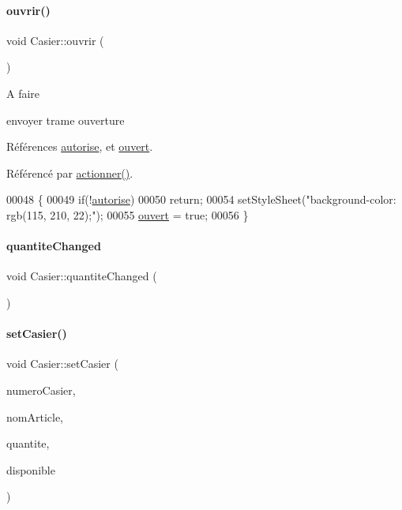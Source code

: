 \paragraph{\texorpdfstring{ouvrir()}{ouvrir()}}
{\footnotesize\ttfamily void Casier\+::ouvrir (\begin{DoxyParamCaption}{ }\end{DoxyParamCaption})}

\begin{DoxyRefDesc}{A faire}
\item[\hyperlink{todo__todo000001}{A faire}]envoyer trame ouverture \end{DoxyRefDesc}


Références \hyperlink{class_casier_a2dd9fbe4a93685080a9b5c8f69e3f29a}{autorise}, et \hyperlink{class_casier_afe544ed1a87ce714a9fbbe16126669e4}{ouvert}.



Référencé par \hyperlink{class_casier_a9182fdde9d86e8f67e4d96ca3dad5eaa}{actionner()}.


\begin{DoxyCode}
00048 \{
00049     \textcolor{keywordflow}{if}(!\hyperlink{class_casier_a2dd9fbe4a93685080a9b5c8f69e3f29a}{autorise})
00050         \textcolor{keywordflow}{return};
00054     setStyleSheet(\textcolor{stringliteral}{"background-color: rgb(115, 210, 22);"});
00055     \hyperlink{class_casier_afe544ed1a87ce714a9fbbe16126669e4}{ouvert} = \textcolor{keyword}{true};
00056 \}
\end{DoxyCode}
\mbox{\label{class_casier_af38fa35a703495e3708528f60459efa4}} 
\paragraph{\texorpdfstring{quantite\+Changed}{quantiteChanged}}
{\footnotesize\ttfamily void Casier\+::quantite\+Changed (\begin{DoxyParamCaption}{ }\end{DoxyParamCaption})\hspace{0.3cm}{\ttfamily [signal]}}

\mbox{\label{class_casier_a140dc38c9e87815b2ce7fc6dce33080b}} 
\paragraph{\texorpdfstring{set\+Casier()}{setCasier()}}
{\footnotesize\ttfamily void Casier\+::set\+Casier (\begin{DoxyParamCaption}\item[{int}]{numero\+Casier,  }\item[{Q\+String}]{nom\+Article,  }\item[{int}]{quantite,  }\item[{int}]{disponible }\end{DoxyParamCaption})}



